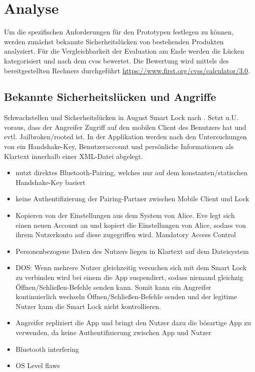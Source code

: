 \section{Analyse}
\label{sec:analysis}
	
	Um die spezifischen Anforderungen für den Prototypen festlegen zu können, werden zunächst bekannte Sicherheitslücken von bestehenden Produkten analysiert. 
	Für die Vergleichbarkeit der Evaluation am Ende werden die Lücken kategorisiert und nach dem \gls{cvss} bewertet.
	Die Bewertung wird mittels des bereitgestellten Rechners durchgeführt \url{https://www.first.org/cvss/calculator/3.0}.

\subsection{Bekannte Sicherheitslücken und Angriffe}
\label{sec:analysis_weaknesses}

	Schwachstellen und Sicherheitslücken in August Smart Lock nach \citeauthor{Ye2017}.
	Setzt u.U. voraus, dass der Angreifer Zugriff auf den mobilen Client des Benutzers hat und evtl. Jailbroken/rooted ist.
	In der Applikation werden nach den Untersuchungen von \citeauthor{Ye2017} ein Handshake-Key, Benutzeraccount und persönliche Informationen als Klartext innerhalb einer XML-Datei abgelegt.
	\begin{itemize}
		\item nutzt direktes Bluetooth-Pairing, welches nur auf dem konstanten/statischen Handshake-Key basiert
		\item keine Authentifizierung der Pairing-Partner zwischen Mobile Client und Lock
		\item Kopieren von der Einstellungen aus dem System von Alice.
		    Eve legt sich einen neuen Account an und kopiert die Einstellungen von Alice, sodass von ihrem Nutzerkonto auf diese zugegriffen wird. \textrightarrow Mandatory Access Control
		\item Personenbezogene Daten des Nutzers liegen in Klartext auf dem Dateisystem
		\item DOS: Wenn mehrere Nutzer gleichzeitig versuchen sich mit dem Smart Lock zu verbinden wird bei einem die App suspendiert, sodass niemand gleichzig Öffnen/Schließen-Befehle senden kann.
		    Somit kann ein Angreifer kontinuierlich wechseln Öffnen/Schließen-Befehle senden und der legitime Nutzer kann die Smart Lock nicht kontrollieren.
	   \item Angreifer repliziert die App und bringt den Nutzer dazu die bösartige App zu verwenden, da keine Authentifizierung zwischen App und Nutzer
	   \item Bluetooth interfering
	   \item OS Level flaws
	\end{itemize}

